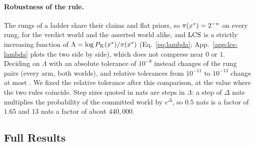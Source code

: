 \paragraph{Robustness of the rule.} The rungs of a ladder share their claims and flat priors, so
$\pi(x^{\ast})=2^{-n}$ on every rung, for the verdict world and the asserted world alike, and $\mathrm{LCS}$ is a
strictly increasing function of $\Lambda=\log P_{\mathcal{R}}(x^{\ast})/\pi(x^{\ast})$ (Eq.~\ref{eq:lambda};
App.~\ref{app:lcs-lambda} plots the two side by side), which does not compress near $0$ or $1$.
Deciding on $\Lambda$ with an absolute tolerance of $10^{-9}$ instead changes
\sThreeLcsRuleLamDis{} of the \sThreeLcsRulePairs{} rung pairs (every arm, both worlds), and relative
tolerances from $10^{-11}$ to $10^{-13}$ change at most \sThreeLcsRuleAltMaxDis. We fixed the
relative tolerance after this comparison, at the value where the two rules coincide. Step sizes quoted in nats are
steps in $\Lambda$: a step of $\Delta$ nats multiplies the probability of the committed world by
$e^{\Delta}$, so $0.5$ nats is a factor of $1.65$ and $13$ nats a factor of about $440{,}000$.

\subsection{Full Results}

